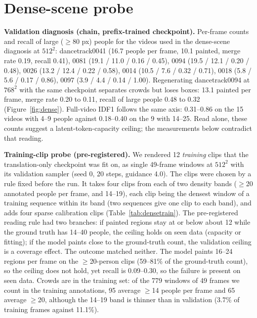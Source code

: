 \documentclass{article} %
\newcommand{\rev}[1]{#1}
\begin{document}
\section{Dense-scene probe}
\label{app:dense}
\rev{\textbf{Validation diagnosis (chain, prefix-trained checkpoint).}}
Per-frame counts and recall of large ($\geq$80 px) people for the videos used in the
dense-scene diagnosis at $512^2$: dancetrack0041 (16.7 people per frame, 10.1 painted,
merge rate 0.19, recall 0.41), 0081 (19.1 / 11.0 / 0.16 / 0.45), 0094 (19.5 / 12.1 / 0.20 /
0.48), 0026 (13.2 / 12.4 / 0.22 / 0.58), 0014 (10.5 / 7.6 / 0.32 / 0.71), 0018 (5.8 / 5.6 /
0.17 / 0.86), 0097 (3.9 / 4.4 / 0.14 / 1.00). Regenerating dancetrack0094 at $768^2$ with the
same checkpoint separates crowds but loses boxes: 13.1 painted per frame, merge rate 0.20 to
0.11, recall of large people 0.48 to 0.32 (Figure~\ref{fig:dense}). Full-video IDF1 follows
the same axis: \rev{0.31}--0.86 on the \rev{15} videos with 4--9 people against 0.18--\rev{0.40} on the \rev{9} with
14--25\rev{. Read alone, these counts suggest a latent-token-capacity ceiling;
the measurements below contradict that reading.}

\rev{\textbf{Training-clip probe (pre-registered).} We rendered 12 \emph{training} clips
that the translation-only checkpoint was fit on, as single 49-frame windows at $512^2$ with
its validation sampler (seed 0, 20 steps, guidance 4.0). The clips were chosen by a rule fixed
before the run. It takes four clips from each of two density bands ($\geq$20 annotated people
per frame, and 14--19), each clip being the densest window of a training sequence within its band (two
sequences give one clip to each band), and adds four sparse calibration clips
(Table~\ref{tab:densetrain}). The pre-registered reading rule had two
branches: if painted regions stay at or below about 12 while the ground truth has 14--40
people, the ceiling holds on seen data (capacity or fitting); if the model paints close to
the ground-truth count, the validation ceiling is a coverage effect. The outcome matched
neither. The model paints 16--24 regions per frame on the $\geq$20-person clips (59--81\% of
the ground-truth count), so the ceiling does not hold, yet recall is 0.09--0.30, so the
failure is present on seen data. Crowds are in the training set: of the 779 windows of 49 frames
we count in the training annotations, 95 average $\geq$14 people per frame and 65 average $\geq$20, although the 14--19 band is
thinner than in validation (3.7\% of training frames against 11.1\%).}
\end{document}

